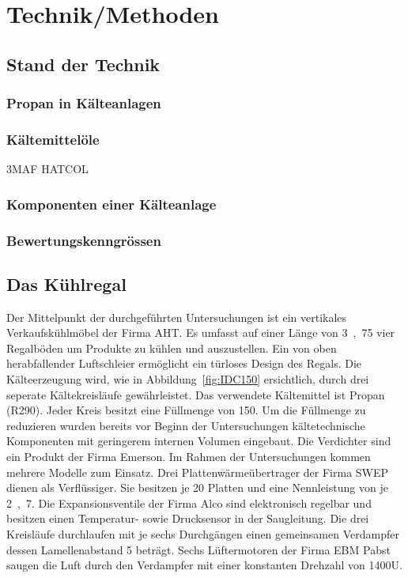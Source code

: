\chapter{Technik/Methoden}
\label{cha:Technik}

\section{Stand der Technik}
\label{sec:Stand der Technik}

\subsection{Propan in Kälteanlagen}
\label{subsec:Propan in Kälteanlagen}



\subsection{Kältemittelöle}
\label{subsec:Kältemitteloele}


3MAF HATCOL


\subsection{Komponenten einer Kälteanlage}
\label{subsec:Komponenten einer Kälteanlage}

\subsection{Bewertungskenngrössen}
\label{subsec:Bewertungskenngrössen}

\section{Das Kühlregal}
\label{sec:Das Kühlregal}

Der Mittelpunkt der durchgeführten Untersuchungen ist ein vertikales Verkaufskühlmöbel der Firma AHT.
Es umfasst auf einer Länge von \unit{3,75}{\metre} vier Regalböden um Produkte zu kühlen und auszustellen. Ein von oben herabfallender Luftschleier ermöglicht ein türloses Design des Regals. Die Kälteerzeugung wird, wie in Abbildung~\ref{fig:IDC150} ersichtlich, durch drei seperate Kältekreisläufe gewährleistet. Das verwendete Kältemittel ist Propan (R290). Jeder Kreis besitzt eine Füllmenge von \unit{150}{\gram}. Um die Füllmenge zu reduzieren wurden bereits vor Beginn der Untersuchungen kältetechnische Komponenten mit geringerem internen Volumen eingebaut. Die Verdichter sind ein Produkt der Firma Emerson. Im Rahmen der Untersuchungen kommen mehrere Modelle zum Einsatz. Drei Plattenwärmeübertrager der Firma SWEP dienen als Verflüssiger. Sie besitzen je 20 Platten und eine Nennleistung von je \unit{2,7}{\kilo\watt}. Die Expansionsventile der Firma Alco sind elektronisch regelbar und besitzen einen Temperatur- sowie Drucksensor in der Saugleitung. Die drei Kreisläufe durchlaufen mit je sechs Durchgängen einen gemeinsamen Verdampfer dessen Lamellenabstand \unit{5}{\milli\metre} beträgt. Sechs Lüftermotoren der Firma EBM Pabst saugen die Luft durch den Verdampfer mit einer konstanten Drehzahl von \unit{1400}{U\per\min}.

